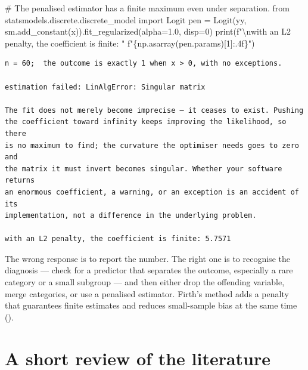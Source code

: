 \documentclass[
  letterpaper,
  10pt,
  twoside,
  openright,
  numbers=noenddot,
  chapterprefix=true]{scrbook}
\newenvironment{Shaded}{}{}
\newcommand{\BuiltInTok}[1]{\textcolor[rgb]{0.84,0.23,0.29}{#1}}
\newcommand{\CharTok}[1]{\textcolor[rgb]{0.01,0.18,0.38}{#1}}
\newcommand{\CommentTok}[1]{\textcolor[rgb]{0.42,0.45,0.49}{#1}}
\newcommand{\DecValTok}[1]{\textcolor[rgb]{0.00,0.36,0.77}{#1}}
\newcommand{\FloatTok}[1]{\textcolor[rgb]{0.00,0.36,0.77}{#1}}
\newcommand{\ImportTok}[1]{\textcolor[rgb]{0.01,0.18,0.38}{#1}}
\newcommand{\NormalTok}[1]{\textcolor[rgb]{0.14,0.16,0.18}{#1}}
\newcommand{\OperatorTok}[1]{\textcolor[rgb]{0.14,0.16,0.18}{#1}}
\newcommand{\SpecialCharTok}[1]{\textcolor[rgb]{0.00,0.36,0.77}{#1}}
\newcommand{\SpecialStringTok}[1]{\textcolor[rgb]{0.01,0.18,0.38}{#1}}
\begin{document}
\begin{Shaded}
\begin{Highlighting}[]
\CommentTok{\# The penalised estimator has a finite maximum even under separation.}
\ImportTok{from}\NormalTok{ statsmodels.discrete.discrete\_model }\ImportTok{import}\NormalTok{ Logit}
\NormalTok{pen }\OperatorTok{=}\NormalTok{ Logit(yy, sm.add\_constant(x)).fit\_regularized(alpha}\OperatorTok{=}\FloatTok{1.0}\NormalTok{, disp}\OperatorTok{=}\DecValTok{0}\NormalTok{)}
\BuiltInTok{print}\NormalTok{(}\SpecialStringTok{f"}\CharTok{\textbackslash{}n}\SpecialStringTok{with an L2 penalty, the coefficient is finite: "}
      \SpecialStringTok{f"}\SpecialCharTok{\{}\NormalTok{np}\SpecialCharTok{.}\NormalTok{asarray(pen.params)[}\DecValTok{1}\NormalTok{]}\SpecialCharTok{:.4f\}}\SpecialStringTok{"}\NormalTok{)}
\end{Highlighting}
\end{Shaded}

\begin{verbatim}
n = 60;  the outcome is exactly 1 when x > 0, with no exceptions.

estimation failed: LinAlgError: Singular matrix

The fit does not merely become imprecise — it ceases to exist. Pushing
the coefficient toward infinity keeps improving the likelihood, so there
is no maximum to find; the curvature the optimiser needs goes to zero and
the matrix it must invert becomes singular. Whether your software returns
an enormous coefficient, a warning, or an exception is an accident of its
implementation, not a difference in the underlying problem.

with an L2 penalty, the coefficient is finite: 5.7571
\end{verbatim}

The wrong response is to report the number. The right one is to
recognise the diagnosis --- check for a predictor that separates the
outcome, especially a rare category or a small subgroup --- and then
either drop the offending variable, merge categories, or use a penalised
estimator. Firth's method adds a penalty that guarantees finite
estimates and reduces small-sample bias at the same time
().

\section{A short review of the
literature}\label{a-short-review-of-the-literature-2}
\end{document}
